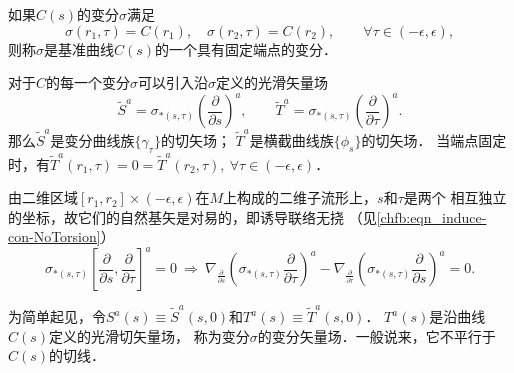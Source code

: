 如果$C(s)$的变分$\sigma$满足
\begin{equation*}
    \sigma(r_1,\tau)=C(r_1), \quad   \sigma(r_2,\tau)=C(r_2), \qquad \forall \tau \in (-\epsilon, \epsilon),
\end{equation*}
则称$\sigma$是基准曲线$C(s)$的一个{\heiti 具有固定端点的变分}．

对于$C$的每一个变分$\sigma$可以引入沿$\sigma$定义的光滑矢量场
\begin{equation}
    \tilde{S}^a = \sigma_{*(s,\tau)}\left(\frac{\partial}{\partial s}\right)^a, \qquad
    \tilde{T}^a = \sigma_{*(s,\tau)}\left(\frac{\partial}{\partial \tau}\right)^a.
\end{equation}
那么$\tilde{S}^a$是变分曲线族$\{\gamma_\tau\}$的切矢场；
$\tilde{T}^a$是横截曲线族$\{\phi_s\}$的切矢场．
当端点固定时，有$\tilde{T}^a(r_1,\tau)=0=\tilde{T}^a(r_2,\tau),\ \forall \tau \in (-\epsilon,\epsilon)$．

由二维区域$[r_1,r_2]\times (-\epsilon, \epsilon)$在$M$上构成的二维子流形上，$s$和$\tau$是两个
相互独立的坐标，故它们的自然基矢是对易的，即诱导联络无挠
（见\eqref{chfb:eqn_induce-con-NoTorsion}）
\begin{equation}\label{chgd:eqn_stts}
    \sigma_{*(s,\tau)}\left[\frac{\partial}{\partial s}, \frac{\partial}{\partial \tau}\right]^a = 0
     {\  \Rightarrow \ }
     \nabla_{\frac{\partial}{\partial s}}
       \left(\sigma_{*(s,\tau)}\frac{\partial}{\partial \tau}\right)^a -
     \nabla_{\frac{\partial}{\partial \tau}}
       \left(\sigma_{*(s,\tau)}\frac{\partial}{\partial s}\right)^a = 0 .
\end{equation}


为简单起见，令$S^a(s)\equiv \tilde{S}^a(s,0)$和$T^a(s)\equiv \tilde{T}^a(s,0)$．
$T^a(s)$是沿曲线$C(s)$定义的光滑切矢量场，
称为变分$\sigma$的{\heiti 变分矢量场}．一般说来，它不平行于$C(s)$的切线．


